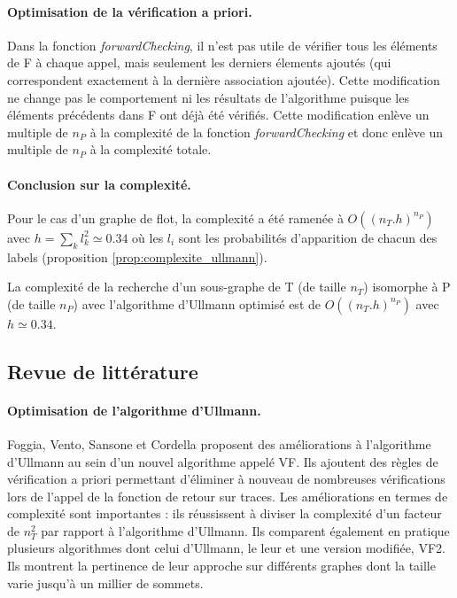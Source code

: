 \paragraph{Optimisation de la vérification a priori.}
Dans la fonction \emph{forwardChecking}, il n'est pas utile de vérifier tous les éléments de F à chaque appel, mais seulement les derniers élements ajoutés (qui correspondent exactement à la dernière association ajoutée). Cette modification ne change pas le comportement ni les résultats de l'algorithme puisque les éléments précédents dans F ont déjà été vérifiés.
Cette modification enlève un multiple de $n_P$ à la complexité de la fonction \emph{forwardChecking} et donc enlève un multiple de $n_P$ à la complexité totale.

\paragraph{Conclusion sur la complexité.} 
Pour le cas d'un graphe de flot, la complexité a été ramenée à $O((n_T.h)^{n_P})$ avec $h=\sum_kl_k^2\simeq 0.34$ où les $l_i$ sont les probabilités d'apparition de chacun des labels (proposition \ref{prop:complexite_ullmann}).

\begin{prop}
La complexité de la recherche d'un sous-graphe de T (de taille $n_T$) isomorphe à P (de taille $n_P$) avec l'algorithme d'Ullmann optimisé est de $O((n_T.h)^{n_P})$ avec $h\simeq 0.34$.
\label{prop:complexite_ullmann}
\end{prop}

\FloatBarrier
\subsection{Revue de littérature}
\paragraph{Optimisation de l'algorithme d'Ullmann.}
Foggia, Vento, Sansone et Cordella \cite{VF99} proposent des améliorations à l'algorithme d'Ullmann au sein d'un nouvel algorithme appelé VF.
Ils ajoutent des règles de vérification a priori permettant d'éliminer à nouveau de nombreuses vérifications lors de l'appel de la fonction de retour sur traces.
Les améliorations en termes de complexité sont importantes : ils réussissent à diviser la complexité d'un facteur de $n_T^2$ par rapport à l'algorithme d'Ullmann.
Ils comparent également en pratique plusieurs algorithmes \cite{FSV01} dont celui d'Ullmann, le leur et une version modifiée, VF2. Ils montrent la pertinence de leur approche sur différents graphes dont la taille varie jusqu'à un millier de sommets.

